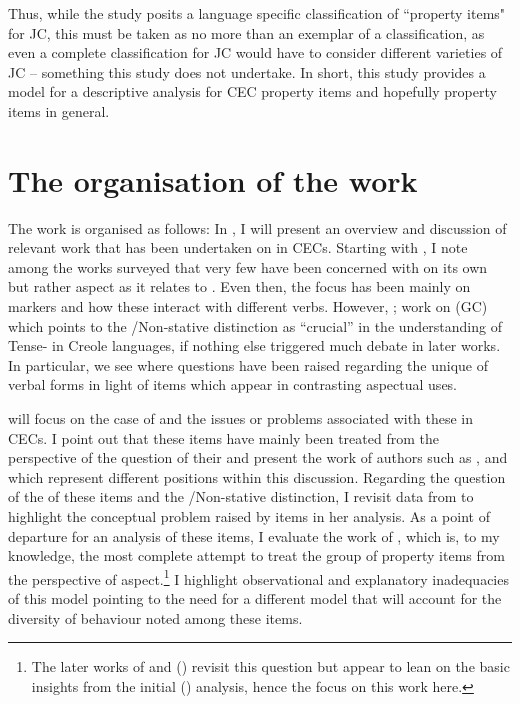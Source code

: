 Thus, while the study posits a language specific classification of
``property items" for JC, this must be taken as no more than an
exemplar of a classification, as even a complete classification for JC
would have to consider different varieties of JC -- something this study
does not undertake. In short, this study provides a model for a
descriptive analysis for CEC property items and hopefully property
items in general.

\section{The organisation of the work}\label{sec:1.9}\largerpage

The work is organised as follows: In , I will present an overview and
discussion of relevant work that has been undertaken on  in CECs.
Starting with \citet{Voorhoeve1957}, I note among the works surveyed that very
few have been concerned with  on its own but rather aspect as it relates
to .  Even then, the focus has been mainly on  markers
and how these interact with different verbs. However, ;
work on  (GC) which points to the \slash Non-stative distinction
as ``crucial'' in the understanding of Tense- in Creole languages, if
nothing else triggered much debate in later works.  In particular, we see where
questions have been raised regarding the unique  of verbal forms
in light of items which appear in contrasting aspectual uses.

 will focus on the case of  and the issues or
problems associated with these in CECs. I point out that these items have mainly
been treated from the perspective of the question of their  and
present the work of authors such as \citet{Sebba1986}, \citet{Seuren1986} and
\citet{Kouwenberg1996} which represent different positions within this
discussion.  Regarding the question of the  of these items and
the \slash Non-stative distinction, I revisit data from \citet{Jaganauth1987}
to highlight the conceptual problem raised by items in her analysis.  As a point
of departure for an analysis of these items, I evaluate the work of
\citet{Winford1993}, which is, to my knowledge, the most complete attempt to
treat the group of property items from the perspective of aspect.\footnote{The
  later works of \citet{Winford1997} and (\citeyear{Winford2000}) revisit this question but appear
  to lean on the basic insights from the initial (\citeyear{Winford1993}) analysis, hence the
focus on this work here.}  I highlight observational and explanatory
inadequacies of this model pointing to the need for a different model that will
account for the diversity of behaviour noted among these items.

